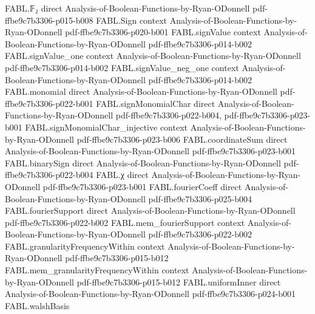 \begin{theorem}
\label{FABL.vectorFourierCoeff_translate_add}
\leanok
{}
\proofstep
  {FABL.𝔽₂}
  {direct}
  {Analysis-of-Boolean-Functions-by-Ryan-ODonnell}
  {pdf-ffbe9c7b3306-p015-b008}
\proofstep
  {FABL.Sign}
  {context}
  {Analysis-of-Boolean-Functions-by-Ryan-ODonnell}
  {pdf-ffbe9c7b3306-p020-b001}
\proofstep
  {FABL.signValue}
  {context}
  {Analysis-of-Boolean-Functions-by-Ryan-ODonnell}
  {pdf-ffbe9c7b3306-p014-b002}
\proofstep
  {FABL.signValue_one}
  {context}
  {Analysis-of-Boolean-Functions-by-Ryan-ODonnell}
  {pdf-ffbe9c7b3306-p014-b002}
\proofstep
  {FABL.signValue_neg_one}
  {context}
  {Analysis-of-Boolean-Functions-by-Ryan-ODonnell}
  {pdf-ffbe9c7b3306-p014-b002}
\proofstep
  {FABL.monomial}
  {direct}
  {Analysis-of-Boolean-Functions-by-Ryan-ODonnell}
  {pdf-ffbe9c7b3306-p022-b001}
\proofstep
  {FABL.signMonomialChar}
  {direct}
  {Analysis-of-Boolean-Functions-by-Ryan-ODonnell}
  {pdf-ffbe9c7b3306-p022-b004,
    pdf-ffbe9c7b3306-p023-b001}
\proofstep
  {FABL.signMonomialChar_injective}
  {context}
  {Analysis-of-Boolean-Functions-by-Ryan-ODonnell}
  {pdf-ffbe9c7b3306-p023-b006}
\proofstep
  {FABL.coordinateSum}
  {direct}
  {Analysis-of-Boolean-Functions-by-Ryan-ODonnell}
  {pdf-ffbe9c7b3306-p023-b001}
\proofstep
  {FABL.binarySign}
  {direct}
  {Analysis-of-Boolean-Functions-by-Ryan-ODonnell}
  {pdf-ffbe9c7b3306-p022-b004}
\proofstep
  {FABL.χ}
  {direct}
  {Analysis-of-Boolean-Functions-by-Ryan-ODonnell}
  {pdf-ffbe9c7b3306-p023-b001}
\proofstep
  {FABL.fourierCoeff}
  {direct}
  {Analysis-of-Boolean-Functions-by-Ryan-ODonnell}
  {pdf-ffbe9c7b3306-p025-b004}
\proofstep
  {FABL.fourierSupport}
  {direct}
  {Analysis-of-Boolean-Functions-by-Ryan-ODonnell}
  {pdf-ffbe9c7b3306-p022-b002}
\proofstep
  {FABL.mem_fourierSupport}
  {context}
  {Analysis-of-Boolean-Functions-by-Ryan-ODonnell}
  {pdf-ffbe9c7b3306-p022-b002}
\proofstep
  {FABL.granularityFrequencyWithin}
  {context}
  {Analysis-of-Boolean-Functions-by-Ryan-ODonnell}
  {pdf-ffbe9c7b3306-p015-b012}
\proofstep
  {FABL.mem_granularityFrequencyWithin}
  {context}
  {Analysis-of-Boolean-Functions-by-Ryan-ODonnell}
  {pdf-ffbe9c7b3306-p015-b012}
\proofstep
  {FABL.uniformInner}
  {direct}
  {Analysis-of-Boolean-Functions-by-Ryan-ODonnell}
  {pdf-ffbe9c7b3306-p024-b001}
\proofstep
  {FABL.walshBasis}

\end{theorem}
